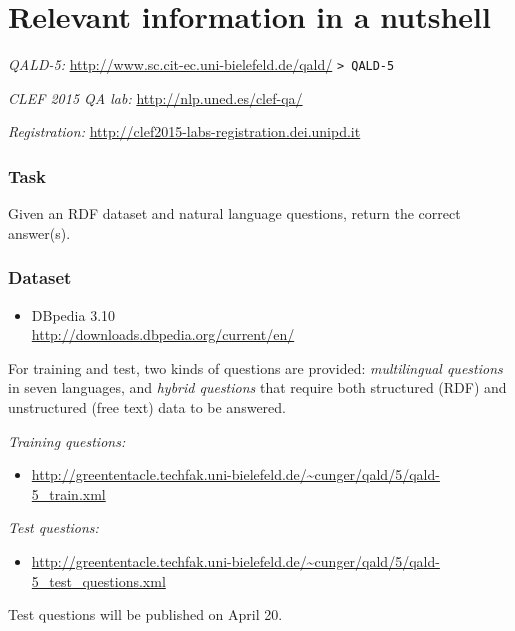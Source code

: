 \documentclass[a4paper]{article}
\begin{document}
{\newpage

\section{Relevant information in a nutshell}

{\em QALD-5:} \url{http://www.sc.cit-ec.uni-bielefeld.de/qald/} \texttt{> QALD-5}

{\em CLEF 2015 QA lab:} \url{http://nlp.uned.es/clef-qa/}

\emph{Registration:} \url{http://clef2015-labs-registration.dei.unipd.it}



\subsubsection*{Task}

Given an RDF dataset and natural language questions, return the correct answer(s). 

\subsubsection*{Dataset}

\begin{itemize} 
\item DBpedia 3.10\\ \url{http://downloads.dbpedia.org/current/en/}
\end{itemize} 

For training and test, two kinds of questions are provided: 
\emph{multilingual questions} in seven languages, 
and \emph{hybrid questions} that require both structured (RDF) and unstructured (free text) data to be answered.

{\em Training questions:} 

\vspace{-.3cm}

\begin{itemize} 
\item \url{http://greententacle.techfak.uni-bielefeld.de/~cunger/qald/5/qald-5_train.xml} 
\end{itemize} 

{\em Test questions:} 

\vspace{-.3cm}

\begin{itemize}
\item \url{http://greententacle.techfak.uni-bielefeld.de/~cunger/qald/5/qald-5_test_questions.xml} 
\end{itemize}
Test questions will be published on April 20.


}
\end{document}
